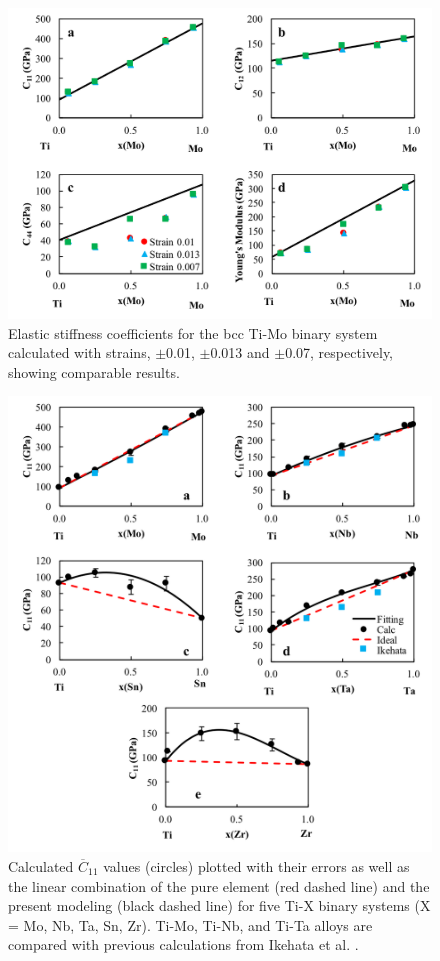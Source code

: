 \pagebreak
\begin{figure}[H]
	\centering
	\includegraphics[width=\textwidth]{Chapter-5/Figures/Strain.png}
	\caption{Elastic stiffness coefficients for the bcc Ti-Mo binary system calculated with strains, $\pm$0.01, $\pm$0.013 and $\pm$0.07, respectively, showing comparable results.}
	\label{Ch5-figure:Strain}
\end{figure}

\pagebreak
\begin{figure}[H]
	\centering
	\includegraphics[width=\textwidth]{Chapter-5/Figures/tixc11.png}
	\caption{Calculated $\overline{C}_{11}$ values (circles) plotted with their errors as well as the linear combination of the pure element (red dashed line) and the present modeling (black dashed line) for five Ti-X binary systems (X = Mo, Nb, Ta, Sn, Zr). Ti-Mo, Ti-Nb, and Ti-Ta alloys are compared with previous calculations from Ikehata et al. \cite{Ikehata2004}.}
	\label{Ch5-figure:tixc11}
\end{figure}

